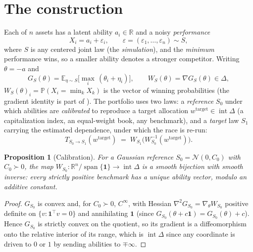 \documentclass[11pt]{article}
\newtheorem{proposition}{Proposition}
\newcommand{\E}{\mathbb{E}}
\newcommand{\Prob}{\mathbb{P}}
\newcommand{\R}{\mathbb{R}}
\begin{document}
\section{The construction}
\label{sec:method}

Each of $n$ assets has a latent ability $a_i \in \R$ and a noisy
\emph{performance}
\begin{equation}
  X_i = a_i + \varepsilon_i, \qquad
  \varepsilon = (\varepsilon_1,\dots,\varepsilon_n) \sim S,
  \label{eq:performance}
\end{equation}
where $S$ is any centered joint law (the \emph{simulation}), and the
\emph{minimum} performance wins, so a smaller ability denotes a stronger
competitor. Writing $\theta = -a$ and
\begin{equation}
  G_S(\theta) = \E_{\eta\sim S}\Big[\max_i\,(\theta_i + \eta_i)\Big], \qquad
  W_S(\theta) = \nabla G_S(\theta) \in \Delta,
  \label{eq:popmap}
\end{equation}
$W_S(\theta)_i = \Prob(X_i = \min_k X_k)$ is the vector of winning
probabilities (the gradient identity is part of ). The
portfolio uses two laws: a \emph{reference} $S_0$ under which abilities are
\emph{calibrated} to reproduce a target allocation
$w^{\mathrm{target}} \in \operatorname{int}\Delta$ (a capitalization index, an
equal-weight book, any benchmark), and a \emph{target} law $S_1$ carrying the
estimated dependence, under which the race is re-run:
\begin{equation}
  T_{S_0\to S_1}(w^{\mathrm{target}})
  \;=\; W_{S_1}\!\big(W_{S_0}^{-1}(w^{\mathrm{target}})\big).
  \label{eq:tiltmap}
\end{equation}

\begin{proposition}[Calibration]
\label{prop:calib}
For a Gaussian reference $S_0 = \mathcal N(0, C_0)$ with $C_0 \succ 0$, the map
$W_{S_0} : \R^n/\operatorname{span}\{\mathbf 1\} \to \operatorname{int}\Delta$
is a smooth bijection with smooth inverse: every strictly positive benchmark
has a unique ability vector, modulo an additive constant.
\end{proposition}
\begin{proof}
$G_{S_0}$ is convex and, for $C_0 \succ 0$, $C^\infty$, with Hessian
$\nabla^2 G_{S_0} = \nabla_\theta W_{S_0}$ positive definite on
$\{v : \mathbf 1^\top v = 0\}$ and annihilating $\mathbf 1$ (since
$G_{S_0}(\theta + c\mathbf 1) = G_{S_0}(\theta) + c$). Hence $G_{S_0}$ is
strictly convex on the quotient, so its gradient is a diffeomorphism onto the
relative interior of its range, which is $\operatorname{int}\Delta$ since any
coordinate is driven to $0$ or $1$ by sending abilities to $\mp\infty$.
\end{proof}
\end{document}
